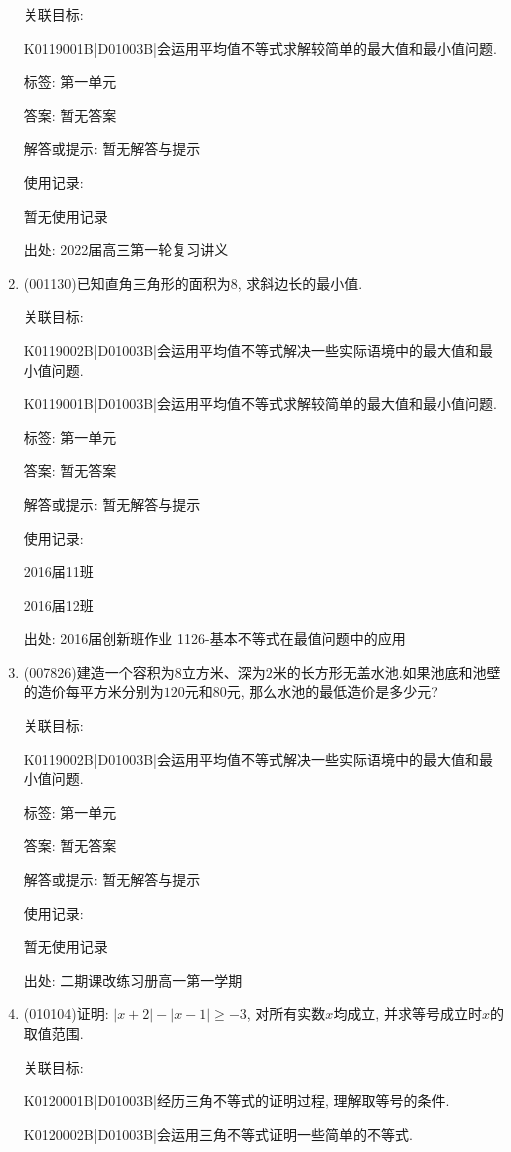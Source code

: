 \documentclass[10pt,a4paper]{article}
\begin{document}
\begin{enumerate}[1.]
关联目标:

K0119001B|D01003B|会运用平均值不等式求解较简单的最大值和最小值问题.



标签: 第一单元

答案: 暂无答案

解答或提示: 暂无解答与提示

使用记录:

暂无使用记录


出处: 2022届高三第一轮复习讲义
\item { (001130)}已知直角三角形的面积为$8$, 求斜边长的最小值.


关联目标:

K0119002B|D01003B|会运用平均值不等式解决一些实际语境中的最大值和最小值问题.

K0119001B|D01003B|会运用平均值不等式求解较简单的最大值和最小值问题.



标签: 第一单元

答案: 暂无答案

解答或提示: 暂无解答与提示

使用记录:

2016届11班	

2016届12班	


出处: 2016届创新班作业	1126-基本不等式在最值问题中的应用
\item { (007826)}建造一个容积为$8$立方米、深为$2$米的长方形无盖水池.如果池底和池壁的造价每平方米分别为$120$元和$80$元, 那么水池的最低造价是多少元?


关联目标:

K0119002B|D01003B|会运用平均值不等式解决一些实际语境中的最大值和最小值问题.



标签: 第一单元

答案: 暂无答案

解答或提示: 暂无解答与提示

使用记录:

暂无使用记录


出处: 二期课改练习册高一第一学期
\item { (010104)}证明: $|x+2|-|x-1|\ge -3$, 对所有实数$x$均成立, 并求等号成立时$x$的取值范围.


关联目标:

K0120001B|D01003B|经历三角不等式的证明过程, 理解取等号的条件.

K0120002B|D01003B|会运用三角不等式证明一些简单的不等式.




\end{enumerate}
\end{document}
